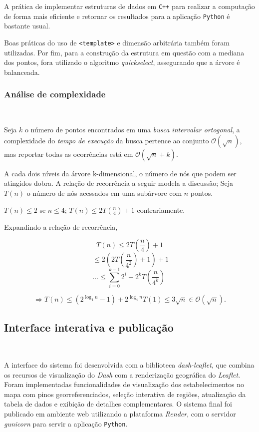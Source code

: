 \documentclass{article}
\begin{document}
\begin{adjustwidth}{-1.5cm}{-1.5cm}
A prática de implementar estruturas de dados em \texttt{C++} para realizar a computação de forma mais eficiente e retornar os resultados para a aplicação \texttt{Python} é bastante usual.

Boas práticas do uso de \texttt{<template>} e dimensão arbitrária também foram utilizadas. Por fim, para a construção da estrutura em questão com a mediana dos pontos, fora utilizado o algoritmo \textit{quickselect}, assegurando que a árvore é balanceada.


\subsubsection{Análise de complexidade}
\

Seja \(k\) o número de pontos encontrados em uma \textit{busca intervalar ortogonal}, a complexidade do \textit{tempo de execução} da busca pertence ao conjunto \(\mathcal{O}(\sqrt{n})\), mas reportar todas as ocorrências está em \(\mathcal{O}(\sqrt{n} + k)\).

A cada dois níveis da árvore k-dimensional, o número de nós que podem ser atingidos dobra. A relação de recorrência a seguir modela a discussão; Seja \(T(n)\) o número de nós acessados em uma subárvore com \(n\) pontos.

\(T(n) \leq 2\) se \(n \le 4\); \(T(n) \leq 2T(\frac{n}{4}) + 1\) contrariamente.

Expandindo a relação de recorrência,

\[T(n) \leq 2T(\frac{n}{4}) + 1\]
\[ \ \leq 2(2T(\frac{n}{4^2})+ 1) + 1 \]
\[... \leq \sum_{i=0}^{k-1}2^i + 2^k T(\frac{n}{4^k}) \ \]

\[\Rightarrow T(n) \leq (2^{\log_4 n} -1 ) + 2^{\log_4 n}T(1) \leq 3 \sqrt{n} \in \mathcal{O}(\sqrt{n}).\]


\subsection{Interface interativa e publicação}
\ 

A interface do sistema foi desenvolvida com a biblioteca \textit{dash-leaflet}, que combina os recursos de visualização do \textit{Dash} com a renderização geográfica do \textit{Leaflet}. Foram implementadas funcionalidades de visualização dos estabelecimentos no mapa com pinos georreferenciados, seleção interativa de regiões, atualização da tabela de dados e exibição de detalhes complementares. O sistema final foi publicado em ambiente web utilizando a plataforma \textit{Render}, com o servidor \textit{gunicorn} para servir a aplicação \texttt{Python}.



\end{adjustwidth}
\end{document}
